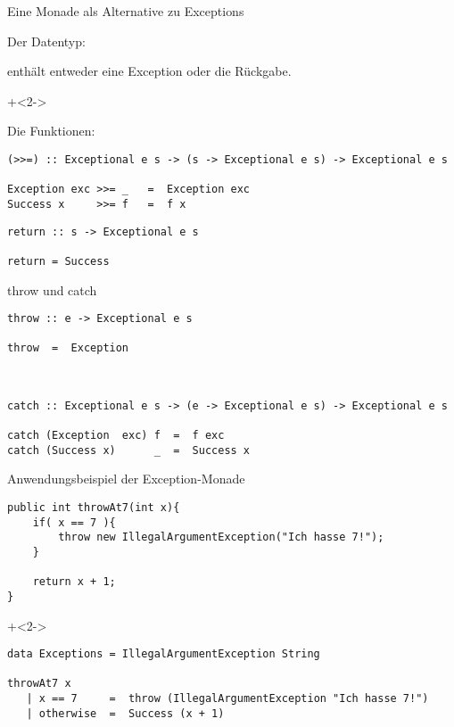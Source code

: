 \begin{frame}[fragile]{Eine Monade als Alternative zu Exceptions}

Der Datentyp:


enthält entweder eine Exception oder die Rückgabe.

\onslide+<2->

Die Funktionen:
\begin{lstlisting}
(>>=) :: Exceptional e s -> (s -> Exceptional e s) -> Exceptional e s

Exception exc >>= _   =  Exception exc
Success x     >>= f   =  f x
\end{lstlisting}


\begin{lstlisting}
return :: s -> Exceptional e s

return = Success
\end{lstlisting}
\end{frame}

\begin{frame}[fragile]{throw und catch}
\begin{lstlisting}
throw :: e -> Exceptional e s

throw  =  Exception
\end{lstlisting}

~

\begin{lstlisting}
catch :: Exceptional e s -> (e -> Exceptional e s) -> Exceptional e s

catch (Exception  exc) f  =  f exc
catch (Success x)      _  =  Success x
\end{lstlisting}

\end{frame}


\begin{frame}[fragile]{Anwendungsbeispiel der Exception-Monade}
\begin{lstlisting}
public int throwAt7(int x){
    if( x == 7 ){
        throw new IllegalArgumentException("Ich hasse 7!");
    }
    
    return x + 1;
}
\end{lstlisting}

\onslide+<2->

\begin{lstlisting}
data Exceptions = IllegalArgumentException String

throwAt7 x
   | x == 7     =  throw (IllegalArgumentException "Ich hasse 7!")
   | otherwise  =  Success (x + 1)
\end{lstlisting}


\end{frame}

